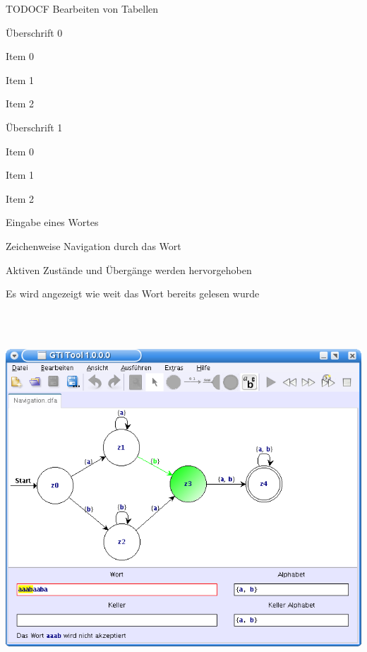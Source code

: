 {
TODOCF Bearbeiten von Tabellen
    \begin{itemgroup}{Überschrift 0}
	\item Item 0
	\item Item 1
	\item Item 2
	\end{itemgroup}
    
	\begin{itemgroup}{Überschrift 1}
	\item Item 0
	\item Item 1
	\item Item 2
	\end{itemgroup}
}

{
    \begin{itemgroup}{}
	\item Eingabe eines Wortes
	\item Zeichenweise Navigation durch das Wort
	\item Aktiven Zustände und Übergänge werden hervorgehoben
	\item Es wird angezeigt wie weit das Wort bereits gelesen wurde
	\end{itemgroup}

	\vfill{}
}

{
  \begin{center}
    \includegraphics[height=14cm]{../images/dfa_navigation.png}
  \end{center}
}

